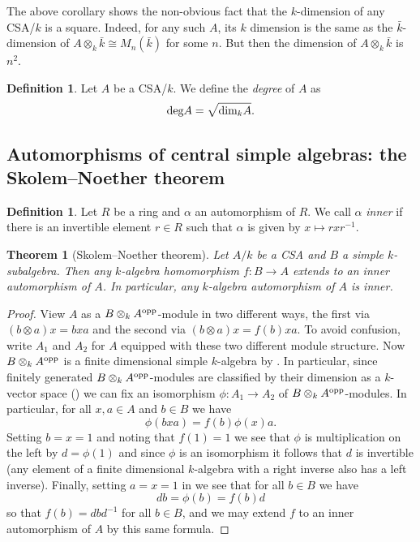 \documentclass[11pt]{amsart}
\numberwithin{equation}{section}
\newtheorem{theorem}[equation]{Theorem}
\theoremstyle{remark}
\theoremstyle{remark}
\theoremstyle{remark}
\theoremstyle{definition}
\theoremstyle{definition}
\theoremstyle{definition}
\newtheorem{defi}[equation]{Definition}
\theoremstyle{definition}
\theoremstyle{definition}
\theoremstyle{definition}
\begin{document}
The above corollary shows the non-obvious fact that the $k$-dimension of any CSA/$k$ is a square. Indeed, for any such $A$, its $k$ dimension is the same as the $\bar{k}$-dimension of $A\otimes_k \bar{k}\cong M_n(\bar{k})$ for some $n$. But then the dimension of $A\otimes_k \bar{k}$ is $n^2$.

\begin{defi}
Let $A$ be a CSA/$k$. We define the \textit{degree} of $A$ as
\[\textup{deg}A=\sqrt{\textup{dim}_k A}.\]
\end{defi}

\subsection{Automorphisms of central simple algebras: the Skolem--Noether theorem}

\begin{defi}
Let $R$ be a ring and $\alpha$ an automorphism of $R$. We call $\alpha$ \textit{inner} if there is an invertible element $r\in R$ such that $\alpha$ is given by $x\mapsto rxr^{-1}$.
\end{defi}

\begin{theorem}[Skolem--Noether theorem] \label{skolem-noether}
Let $A/k$ be a CSA and $B$ a simple $k$-subalgebra. Then any $k$-algebra homomorphism $f:B\rightarrow A$ extends to an inner automorphism of $A$. In particular, any $k$-algebra automorphism of $A$ is inner. 
\end{theorem}

\begin{proof}
View $A$ as a $B\otimes_kA^{\textup{opp}}$-module in two different ways, the first via $(b\otimes a)x=bxa$ and the second via $(b\otimes a)x=f(b)xa$. To avoid confusion, write $A_1$ and $A_2$ for $A$ equipped with these two different module structure. Now  $B\otimes_k A^{\textup{opp}}$ is a finite dimensional simple $k$-algebra by . In particular, since finitely generated $B\otimes_k A^{\textup{opp}}$-modules are classified by their dimension as a $k$-vector space () we can fix an isomorphism $\phi:A_1\rightarrow A_2$ of $B\otimes_k A^{\textup{opp}}$-modules. In particular, for all $x,a\in A$ and $b\in B$ we have
\begin{equation} \label{sn eqn}
\phi(bxa)=f(b)\phi(x)a.
\end{equation}
Setting $b=x=1$ and noting that $f(1)=1$ we see that $\phi$ is multiplication on the left by $d=\phi(1)$ and since $\phi$ is an isomorphism it follows that $d$ is invertible (any element of a finite dimensional $k$-algebra with a right inverse also has a left inverse). Finally, setting $a=x=1$ in  we see that for all $b\in B$ we have
\[db=\phi(b)=f(b)d\]
so that $f(b)=dbd^{-1}$ for all $b\in B$, and we may extend $f$ to an inner automorphism of $A$ by this same formula.
\end{proof}
\end{document}
